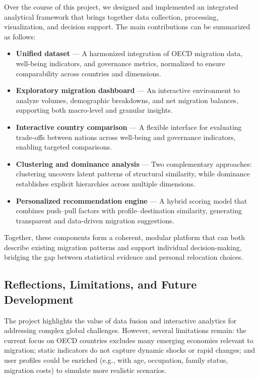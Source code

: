 \documentclass[11pt]{article}
\begin{document}
\noindent
Over the course of this project, we designed and implemented an integrated analytical framework that brings together data collection, processing, visualization, and decision support. The main contributions can be summarized as follows:

\begin{itemize}
    \item \textbf{Unified dataset} — A harmonized integration of OECD migration data, well-being indicators, and governance metrics, normalized to ensure comparability across countries and dimensions.
    
    \item \textbf{Exploratory migration dashboard} — An interactive environment to analyze volumes, demographic breakdowns, and net migration balances, supporting both macro-level and granular insights.
    
    \item \textbf{Interactive country comparison} — A flexible interface for evaluating trade-offs between nations across well-being and governance indicators, enabling targeted comparisons.
    
    \item \textbf{Clustering and dominance analysis} — Two complementary approaches: clustering uncovers latent patterns of structural similarity, while dominance establishes explicit hierarchies across multiple dimensions.
    
    \item \textbf{Personalized recommendation engine} — A hybrid scoring model that combines push–pull factors with profile–destination similarity, generating transparent and data-driven migration suggestions.
\end{itemize}

\noindent
Together, these components form a coherent, modular platform that can both describe existing migration patterns and support individual decision-making, bridging the gap between statistical evidence and personal relocation choices.

\subsection{Reflections, Limitations, and Future Development}

\noindent
The project highlights the value of data fusion and interactive analytics for addressing complex global challenges. However, several limitations remain: the current focus on OECD countries excludes many emerging economies relevant to migration; static indicators do not capture dynamic shocks or rapid changes; and user profiles could be enriched (e.g., with age, occupation, family status, migration costs) to simulate more realistic scenarios.
\end{document}
